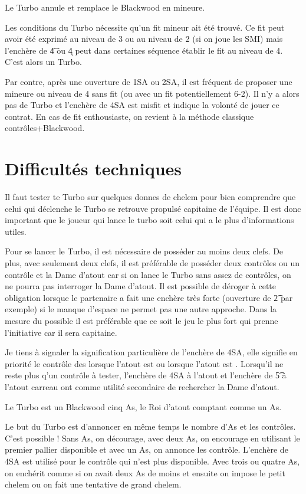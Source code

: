 \documentclass[a4paper,12pt]{article}
\begin{document}
Le Turbo annule et remplace le Blackwood en mineure.

Les conditions du Turbo nécessite qu'un fit mineur ait été trouvé. Ce fit peut avoir été exprimé au niveau de 3 ou au niveau de 2 (si on joue les SMI) mais l'enchère de \t4 ou \k4 peut dans certaines séquence établir le fit au niveau de 4. C'est alors un Turbo.

Par contre, après une ouverture de 1SA ou 2SA, il est fréquent de proposer une mineure ou niveau de 4 sans fit (ou avec un fit potentiellement 6-2). Il n'y a alors pas de Turbo et l'enchère de 4SA est misfit et indique la volonté de jouer ce contrat. En cas de fit enthousiaste, on revient à la méthode classique contrôles+Blackwood.




\section*{Difficultés techniques}
Il faut tester te Turbo sur quelques donnes de chelem pour bien comprendre que celui qui déclenche le Turbo se retrouve propulsé capitaine de l'équipe. Il est donc
important que le joueur qui lance le turbo soit celui qui a le plus d'informations utiles.

Pour se lancer le Turbo, il est nécessaire de posséder au moins deux clefs. De plus, avec seulement deux clefs, il est préférable de posséder deux contrôles ou un contrôle et la Dame d'atout car si on lance le Turbo sans assez de contrôles, on ne pourra pas interroger la Dame d'atout.
Il est possible de déroger à cette obligation lorsque le partenaire a fait une enchère très forte (ouverture de \t2 par exemple) si le manque d'espace ne permet pas une autre approche. Dans la mesure du possible il est préférable que ce soit le jeu le plus fort qui prenne l'initiative car il sera capitaine. 

Je tiens à signaler la signification particulière de l'enchère de 4SA, elle signifie en priorité le contrôle des \K lorsque l'atout est \T ou \C lorsque l'atout est \K. Lorsqu'il ne reste plus q'un contrôle à tester, l'enchère de 4SA à l'atout \T et l'enchère de \t5 à l'atout carreau ont comme utilité secondaire de rechercher la Dame d'atout.

Le Turbo est un Blackwood cinq As, le Roi d'atout comptant comme un As.

Le but du Turbo est d'annoncer en même temps le nombre d'As et les contrôles. C'est possible ! Sans As, on décourage, avec deux As, on encourage en utilisant le premier pallier disponible et avec un As, on annonce les contrôle. L'enchère de 4SA est utilisé pour le contrôle qui n'est plus disponible. Avec trois ou quatre As, on enchérit
comme si on avait deux As de moins et ensuite on impose le petit chelem ou on fait une tentative de grand chelem.
\end{document}

